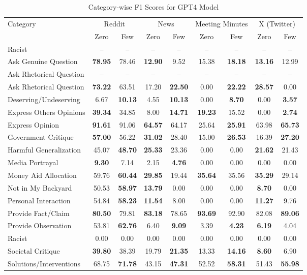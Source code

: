 \begin{table*}[htbp]
\centering
\begin{tabular}{l *{8}{c}}
\toprule
Category & \multicolumn{2}{c}{Reddit} & \multicolumn{2}{c}{News} & \multicolumn{2}{c}{Meeting Minutes} & \multicolumn{2}{c}{X (Twitter)} \\
& Zero & Few & Zero & Few & Zero & Few & Zero & Few \\
\midrule
Racist & -- & -- & -- & -- & -- & -- & -- & -- \\
Ask Genuine Question & \textbf{78.95} & 78.46 & \textbf{12.90} & 9.52 & 15.38 & \textbf{18.18} & \textbf{13.16} & 12.99 \\
Ask Rhetorical Question & -- & -- & -- & -- & -- & -- & -- & -- \\
Ask Rhetorical Question & \textbf{73.22} & 63.51 & 17.20 & \textbf{22.50} & 0.00 & \textbf{22.22} & \textbf{28.57} & 0.00 \\
Deserving/Undeserving & 6.67 & \textbf{10.13} & 4.55 & \textbf{10.13} & 0.00 & \textbf{8.70} & 0.00 & \textbf{3.57} \\
Express Others Opinions & \textbf{39.34} & 34.85 & 8.00 & \textbf{14.71} & \textbf{19.23} & 15.52 & 0.00 & \textbf{2.74} \\
Express Opinion & \textbf{91.61} & 91.06 & \textbf{64.57} & 64.17 & 25.64 & \textbf{25.91} & 63.98 & \textbf{65.73} \\
Government Critique & \textbf{57.00} & 56.22 & \textbf{31.02} & 28.40 & 15.00 & \textbf{26.53} & 16.39 & \textbf{27.20} \\
Harmful Generalization & 45.07 & \textbf{48.70} & \textbf{25.33} & 23.36 & 0.00 & 0.00 & \textbf{21.62} & 21.43 \\
Media Portrayal & \textbf{9.30} & 7.14 & 2.15 & \textbf{4.76} & 0.00 & 0.00 & 0.00 & 0.00 \\
Money Aid Allocation & 59.76 & \textbf{60.44} & \textbf{29.85} & 19.44 & \textbf{35.64} & 35.56 & \textbf{35.29} & 29.14 \\
Not in My Backyard & 50.53 & \textbf{58.97} & \textbf{13.79} & 0.00 & 0.00 & 0.00 & \textbf{8.70} & 0.00 \\
Personal Interaction & 54.84 & \textbf{58.23} & \textbf{11.54} & 8.00 & 0.00 & 0.00 & \textbf{11.27} & 9.76 \\
Provide Fact/Claim & \textbf{80.50} & 79.81 & \textbf{83.18} & 78.65 & \textbf{93.69} & 92.90 & 82.08 & \textbf{89.06} \\
Provide Observation & 53.81 & \textbf{62.76} & 6.40 & \textbf{9.09} & 3.39 & \textbf{4.23} & \textbf{6.19} & 4.04 \\
Racist & 0.00 & 0.00 & 0.00 & 0.00 & 0.00 & 0.00 & 0.00 & 0.00 \\
Societal Critique & \textbf{39.80} & 38.39 & 19.79 & \textbf{21.35} & 13.33 & \textbf{14.16} & \textbf{8.60} & 6.90 \\
Solutions/Interventions & 68.75 & \textbf{71.78} & 43.15 & \textbf{47.31} & 52.52 & \textbf{58.31} & 51.43 & \textbf{55.98} \\
\bottomrule
\end{tabular}
\centering\caption{Category-wise F1 Scores for GPT4 Model}
\label{tab:gpt4_category_breakdown}
\end{table*}